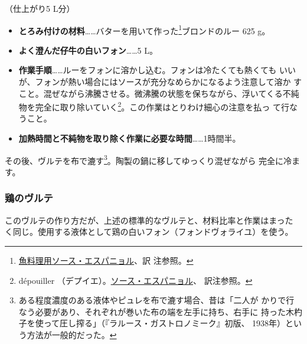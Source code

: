 \begin{recette}
（仕上がり5 L分）

\begin{itemize}
\item
  \textbf{とろみ付けの材料}\ldots{}\ldots{}バターを用いて作った\footnote{\protect\hyperlink{sauce-espagnole-maigre}{魚料理用ソース・エスパニョル}、訳
    注参照。}ブロンドのルー 625 g。
\item
  \textbf{よく澄んだ仔牛の白いフォン}\ldots{}\ldots{}5 L。
\item
  \textbf{作業手順}\ldots{}\ldots{}ルーをフォンに溶かし込む。フォンは冷たくても熱くても
  いいが、フォンが熱い場合にはソースが充分なめらかになるよう注意して溶か
  すこと。混ぜながら沸騰させる。微沸騰の状態を保ちながら、浮いてくる不純
  物を完全に取り除いていく\footnote{dépouiller
    （デプイエ）。\protect\hyperlink{sauce-espagnole}{ソース・エスパニョル}、
    訳注参照。}。この作業はとりわけ細心の注意を払っ て行なうこと。
\item
  \textbf{加熱時間と不純物を取り除く作業に必要な時間}\ldots{}\ldots{}1時間半。
\end{itemize}

その後、ヴルテを布で漉す\footnote{ある程度濃度のある液体やピュレを布で漉す場合、昔は「二人が
  かりで行なう必要があり、それぞれが巻いた布の端を左手に持ち、右手に
  持った木杓子を使って圧し搾る」（『ラルース・ガストロノミーク』初版、
  1938年）という方法が一般的だった。}。陶製の鍋に移してゆっくり混ぜながら
完全に冷ます。

\maeaki

\hypertarget{veloute-de-volaille}{%
\subsubsection{鶏のヴルテ}\label{veloute-de-volaille}}


 

このヴルテの作り方だが、上述の標準的なヴルテと、材料比率と作業はまった
く同じ。使用する液体として鶏の白いフォン（フォンドヴォライユ）を使う。


\end{recette}
